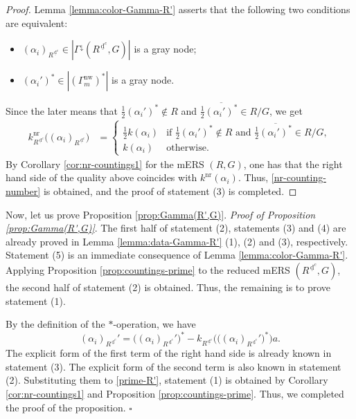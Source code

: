 \documentclass[11pt]{amsart}
\newcommand{\nr}{\mathrm{nr}}
\newcommand{\dc}{\,\underline{\mathrm{d}}^c}
\newcommand{\nw}{\mathrm{nw}}
\begin{document}
{\begin{proof}
Lemma \ref{lemma:color-Gamma-R'} asserts that the following 
two conditions
are equivalent:
\begin{itemize}
\item[(i)] $(\alpha_i)_{R^{\dc}}\in |\Gamma^{\downarrow}(R^{\dc},G)|$ is a gray node;
\vskip 1mm
\item[(ii)] $(\alpha_i')^\ast\in |(\Gamma_m^{\nw})^*|$ is a gray node.
\end{itemize}
Since the later means that $\frac12(\alpha_i')^\ast\not\in R$ and 
$\frac12 \overline{(\alpha_i')^\ast}\in R/G$, we get  
\begin{align*}
 k_{R^{\dc}}^\nr \big((\alpha_i)_{R^{\dc}}\big)
&=\begin{cases}
\frac12 k(\alpha_i)
& \text{if $\frac12(\alpha_i')^\ast\not\in R$ and 
$\frac12 \overline{(\alpha_i')^\ast}\in R/G$},\\
k(\alpha_i) & \text{otherwise}.
\end{cases}
\end{align*}
By Corollary \ref{cor:nr-countings1} for the mERS $(R,G)$, one has that 
the right hand side
of the quality above coincides with $k^\nr (\alpha_i)$. 
Thus,  \eqref{nr-counting-number} is obtained, and the proof of statement
(3) is completed. 
\end{proof}

Now, let us prove Proposition \ref{prop:Gamma(R',G)}. 
\vskip 3mm
\noindent
{\it Proof of Proposition \ref{prop:Gamma(R',G)}}. 
The first half of statement (2), statements (3) and (4) are already proved 
in Lemma \ref{lemma:data-Gamma-R'} (1), (2) and (3), respectively.  Statement 
(5) is an immediate consequence of Lemma \ref{lemma:color-Gamma-R'}. 
Applying Proposition \ref{prop:countings-prime} to the reduced mERS $(R^{\dc},G)$, 
the second half of statement (2) is obtained. 
Thus, the remaining is to prove  statement (1). 

By the definition of the
$\ast$-operation, we have
\begin{equation}\label{prime-R'}
(\alpha_i)_{R^{\dc}}'=\big((\alpha_i)_{R^{\dc}}'\big)^\ast-k_{R^{\dc}}
\big(\big((\alpha_i)_{R^{\dc}}'\big)^\ast\big)a.
\end{equation}
The explicit form of the first term of the right hand side is already known in 
 statement (3). 
The explicit form of the second term is also known in 
statement (2). 
Substituting them to \eqref{prime-R'}, statement (1) is obtained
by Corollary \ref{cor:nr-countings1} and Proposition 
\ref{prop:countings-prime}. 
Thus, we completed  the proof of the proposition. \hfill $\square$
\vskip 5mm
}
\end{document}
